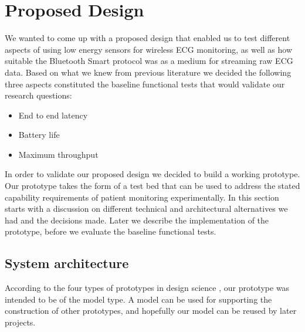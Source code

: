 \section{Proposed Design} %
\label{sec:proposed_design}

We wanted to come up with a proposed design that enabled us to test different aspects of using low energy sensors for wireless ECG monitoring, as well as how suitable the Bluetooth Smart protocol was as a medium for streaming raw ECG data. Based on what we knew from previous literature we decided the following three aspects constituted the baseline functional tests that would validate our research questions:
\begin{itemize}
	
	\item End to end latency
	\item Battery life
	\item Maximum throughput
  
\end{itemize}

In order to validate our proposed design we decided to build a working prototype. Our prototype takes the form of a test bed that can be used to address the stated capability requirements of patient monitoring experimentally. In this section starts with a discussion on different technical and architectural alternatives we had and the decisions made. Later we describe the implementation of the prototype, before we evaluate the baseline functional tests.


\subsection{System architecture} %
\label{sub:system_architecture}

According to the four types of prototypes in design science \cite{ds_bok1_25}, our prototype was intended to be of the model type. A model can be used for supporting the construction of other prototypes, and hopefully our model can be reused by later projects.

